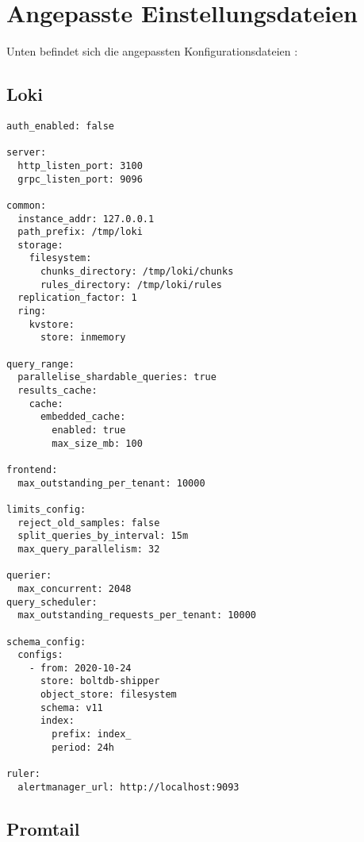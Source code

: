 \section{Angepasste Einstellungsdateien}\label{appendix:AngepasstGrafana}

Unten befindet sich die angepassten Konfigurationsdateien \citep{Polinowski_PGL}:

\subsection{Loki}
{
\begin{Verbatim}[frame=single,fontsize=\small]
auth_enabled: false

server:
  http_listen_port: 3100
  grpc_listen_port: 9096

common:
  instance_addr: 127.0.0.1
  path_prefix: /tmp/loki
  storage:
    filesystem:
      chunks_directory: /tmp/loki/chunks
      rules_directory: /tmp/loki/rules
  replication_factor: 1
  ring:
    kvstore:
      store: inmemory

query_range:
  parallelise_shardable_queries: true
  results_cache:
    cache:
      embedded_cache:
        enabled: true
        max_size_mb: 100

frontend:
  max_outstanding_per_tenant: 10000

limits_config:
  reject_old_samples: false
  split_queries_by_interval: 15m
  max_query_parallelism: 32

querier:
  max_concurrent: 2048
query_scheduler:
  max_outstanding_requests_per_tenant: 10000

schema_config:
  configs:
    - from: 2020-10-24
      store: boltdb-shipper
      object_store: filesystem
      schema: v11
      index:
        prefix: index_
        period: 24h

ruler:
  alertmanager_url: http://localhost:9093  
\end{Verbatim}
}

\newpage
\subsection{Promtail}

